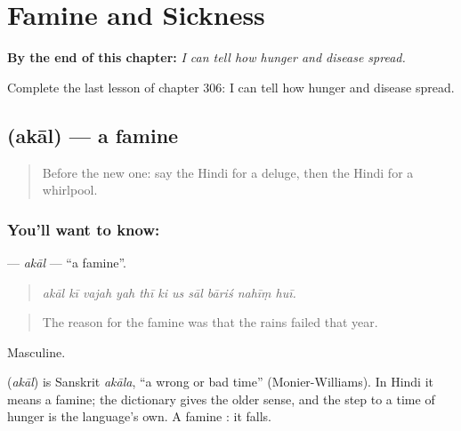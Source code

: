 
\chapter{Famine and Sickness}
\label{ch:hi-famine-and-sickness}

\begin{chapteropening}
\textbf{By the end of this chapter:} \emph{I can tell how hunger and disease spread.}

Complete the last lesson of chapter 306: I can tell how hunger and disease spread.
\end{chapteropening}

\section[\texorpdfstring{\hi{अकाल} (akāl)}{अकाल (akāl)}]{ (akāl) — a famine}

\label{lesson:HI-C306-akal}



\begin{quote}
Before the new one: say the Hindi for a deluge, then the Hindi for a whirlpool.
\end{quote}

\subsection*{You'll want to know: }
\textbf{} — \emph{akāl} — \textquotedblleft{}a famine\textquotedblright{}.

\begin{quote}
          
\end{quote}

\begin{quote}
\emph{akāl kī vajah yah thī ki us sāl bāriś nahīṃ huī.}
\end{quote}

\begin{quote}
The reason for the famine was that the rains failed that year.
\end{quote}

Masculine.

\begin{cousinweb}
\textbf{} (\emph{akāl}) is Sanskrit \emph{akāla}, \textquotedblleft{}a wrong or bad time\textquotedblright{} (Monier-Williams). In Hindi it means a famine; the dictionary gives the older sense, and the step to a time of hunger is the language's own. A famine \textbf{ }: it falls.
\end{cousinweb}

